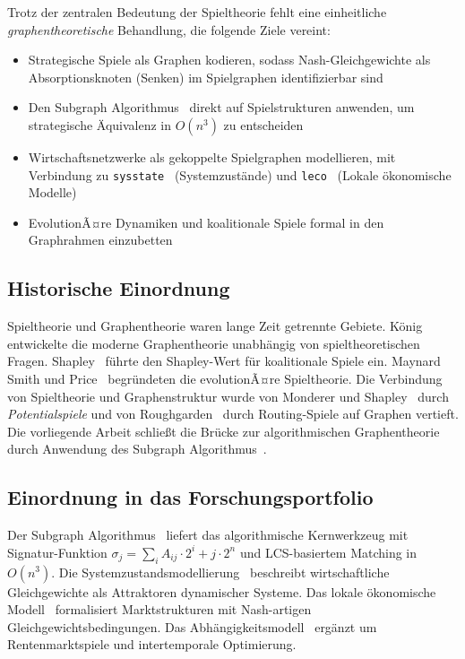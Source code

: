 ﻿\documentclass[a4paper,12pt]{article}
\theoremstyle{definition}
\begin{document}
Trotz der zentralen Bedeutung der Spieltheorie fehlt eine einheitliche
\emph{graphentheoretische} Behandlung, die folgende Ziele vereint:
\begin{itemize}
    \item Strategische Spiele als Graphen kodieren, sodass Nash-Gleichgewichte
          als Absorptionsknoten (Senken) im Spielgraphen identifizierbar sind
    \item Den Subgraph Algorithmus~\cite{epp2026subgraph} direkt auf
          Spielstrukturen anwenden, um strategische \"Aquivalenz in $O(n^3)$
          zu entscheiden
    \item Wirtschaftsnetzwerke als gekoppelte Spielgraphen modellieren,
          mit Verbindung zu \texttt{sysstate}~\cite{epp2026sysstate}
          (Systemzust\"ande) und \texttt{leco}~\cite{epp2026leco} (Lokale
          \"okonomische Modelle)
    \item EvolutionÃ¤re Dynamiken und koalitionale Spiele formal in den
          Graphrahmen einzubetten
\end{itemize}

\subsection{Historische Einordnung}

Spieltheorie und Graphentheorie waren lange Zeit getrennte Gebiete.
K\"onig~\cite{konig1936} entwickelte die moderne Graphentheorie unabh\"angig
von spieltheoretischen Fragen. Shapley~\cite{shapley1953} f\"uhrte den
Shapley-Wert f\"ur koalitionale Spiele ein. Maynard Smith und
Price~\cite{maynardsmith1973} begr\"undeten die evolutionÃ¤re Spieltheorie.
Die Verbindung von Spieltheorie und Graphenstruktur wurde von
Monderer und Shapley~\cite{monderer1996} durch \emph{Potentialspiele} und
von Roughgarden~\cite{roughgarden2005} durch Routing-Spiele auf Graphen vertieft.
Die vorliegende Arbeit schlie{\ss}t die Br\"ucke zur algorithmischen
Graphentheorie durch Anwendung des Subgraph Algorithmus~\cite{epp2026subgraph}.

\subsection{Einordnung in das Forschungsportfolio}

Der Subgraph Algorithmus~\cite{epp2026subgraph} liefert das algorithmische
Kernwerkzeug mit Signatur-Funktion
$\sigma_j = \sum_i A_{ij} \cdot 2^i + j \cdot 2^n$ und LCS-basiertem
Matching in $O(n^3)$.
Die Systemzustandsmodellierung~\cite{epp2026sysstate} beschreibt
wirtschaftliche Gleichgewichte als Attraktoren dynamischer Systeme.
Das lokale \"okonomische Modell~\cite{epp2026leco} formalisiert Marktstrukturen
mit Nash-artigen Gleichgewichtsbedingungen.
Das Abh\"angigkeitsmodell~\cite{epp2026depension} erg\"anzt um Rentenmarktspiele
und intertemporale Optimierung.
\end{document}
